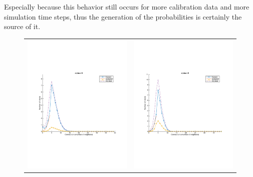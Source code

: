 \documentclass[a4paper, 10pt, conference]{ieeeconf}
\begin{document}
  Especially because this behavior still occurs for more calibration data and more simulation time steps, thus the generation of the probabilities is certainly the source of it.

  \begin{figure}[p]
    \begin{center}
      \begin{tabular}{lr}
        \includegraphics[width=8cm]{figures/simulation-40-alpha-5.pdf}   &
        \includegraphics[width=8cm]{figures/macroscopic-40-alpha-5.pdf}  \\

\end{tabular}
\end{center}
\end{figure}
\end{document}
